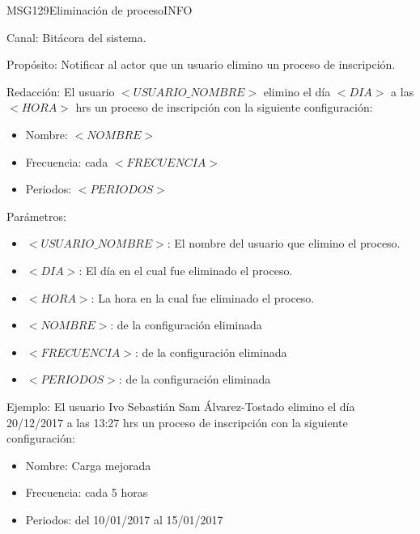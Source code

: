 \begin{mensaje}{MSG129}{Eliminación de proceso}{INFO}
	\item[Canal:] Bitácora del sistema.
	\item[Propósito:] Notificar al actor que un usuario elimino un proceso de inscripción.
	\item[Redacción:] El usuario $<USUARIO\_NOMBRE>$ elimino el día $<DIA>$ a las $<HORA>$ hrs un proceso de inscripción con la siguiente configuración: \cdtEmpty
		\begin{itemize}
			\item Nombre: $<NOMBRE>$
			\item Frecuencia: cada $<FRECUENCIA>$
			\item Periodos: $<PERIODOS>$
		\end{itemize}
	\item[Parámetros:] \cdtEmpty 	
		\begin{itemize}
			\item $<USUARIO\_NOMBRE>$: El nombre del usuario que elimino el proceso.
			\item $<DIA>$: El día en el cual fue eliminado el proceso.
			\item $<HORA>$: La hora en la cual fue eliminado el proceso.
			\item $<NOMBRE>$:  de la configuración eliminada
			\item $<FRECUENCIA>$:  de la configuración eliminada
			\item $<PERIODOS>$:  de la configuración eliminada
		\end{itemize}
	\item[Ejemplo:] El usuario Ivo Sebastián Sam Álvarez-Tostado elimino el día 20/12/2017 a las 13:27 hrs un proceso de inscripción con la siguiente configuración: \cdtEmpty
		\begin{itemize}
			\item Nombre: Carga mejorada
			\item Frecuencia: cada 5 horas
			\item Periodos: del 10/01/2017 al 15/01/2017
		\end{itemize}
\end{mensaje}


